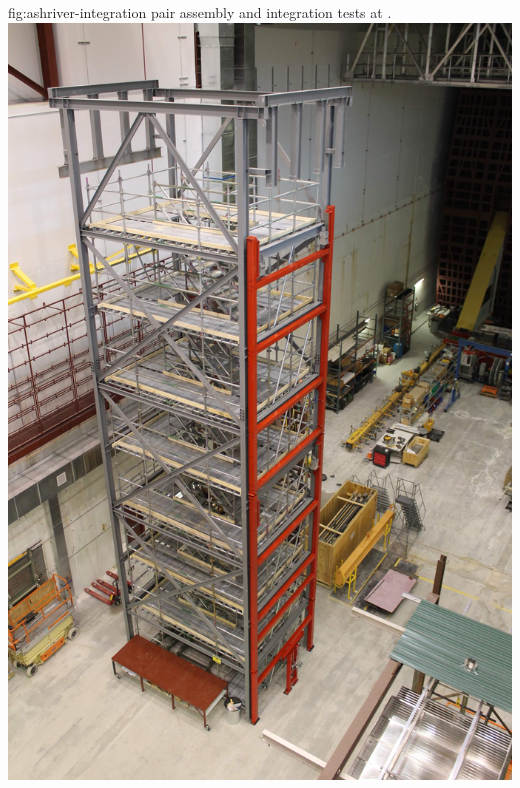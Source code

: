 \begin{dunefigure}{fig:ashriver-integration}
{ pair assembly and integration tests at .}
\includegraphics[height=0.5\textheight]{graphics/sp-apa-ash-river-ladder.jpg} \quad

\end{dunefigure}
